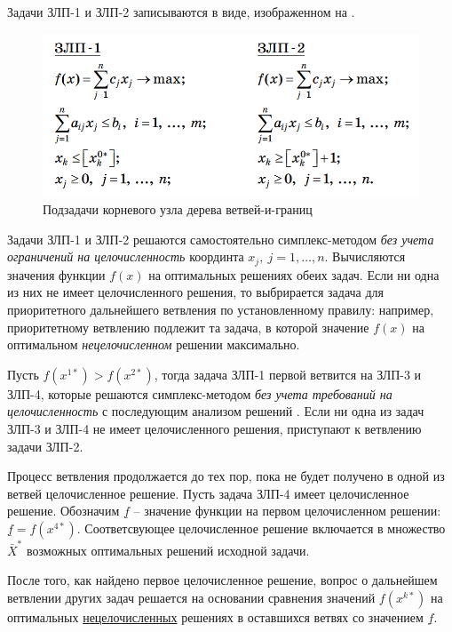 \documentclass[%
	11pt,
	a4paper,
	utf8,
		]{article}
\begin{document}
Задачи ЗЛП-1 и ЗЛП-2 записываются в виде, изображенном на .

\begin{figure}[h]
	\centering
	\includegraphics[scale=0.6]{figures/zlp_1_and_zlp_2.png}
	\caption{ Подзадачи корневого узла дерева ветвей-и-границ }\label{fig:zlp_1_and_zlp_2}
\end{figure}

Задачи ЗЛП-1 и ЗЛП-2 решаются самостоятельно симплекс-методом \emph{без учета ограничений на целочисленность} координта $ x_j, \ j = 1, \ldots, n $. Вычисляются значения функции $ f(x) $ на оптимальных решениях обеих задач. Если ни одна из них не имеет целочисленного решения, то выбрирается задача для приоритетного дальнейшего ветвления по установленному правилу: например, приоритетному ветвлению подлежит та задача, в которой значение $ f(x) $ на оптимальном \emph{нецелочисленном} решении максимально.

Пусть $ f(x^{1*}) > f(x^{2*}) $, тогда задача ЗЛП-1 первой ветвится на ЗЛП-3 и ЗЛП-4, которые решаются симплекс-методом \emph{без учета требований на целочисленность} с последующим анализом решений \cite[]{panteleev}. Если ни одна из задач ЗЛП-3 и ЗЛП-4 не имеет целочисленного решения, приступают к ветвлению задачи ЗЛП-2.

Процесс ветвления продолжается до тех пор, пока не будет получено в одной из ветвей целочисленное решение. Пусть задача ЗЛП-4 имеет целочисленное решение.  Обозначим $ \underline{f} $ -- значение функции на первом целочисленном решении: $ \underline{f} = f(x^{4*}) $. Соответсвующее целочисленное решение включается в множество $ \bar{X}^* $ возможных оптимальных решений исходной задачи.

После того, как найдено первое целочисленное решение, вопрос о дальнейшем ветвлении других задач решается на основании сравнения значений $ f(x^{k*}) $ на оптимальных \underline{нецелочисленных} решениях в оставшихся ветвях со значением $ \underline{f} $.
\end{document}
